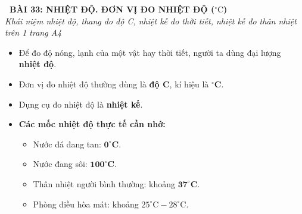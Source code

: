 \documentclass[11pt,a4paper]{article}
\begin{document}
\begin{tcolorbox}[
  enhanced,
  colback=white,
  colframe=primary,
  arc=3mm,
  boxrule=1.2pt,
  left=4mm, right=4mm, top=2.5mm, bottom=2.5mm,
  drop shadow=black!10!white
]
  \centering
  {\Large\bfseries\color{primary}\faBookmark\ BÀI 33: NHIỆT ĐỘ. ĐƠN VỊ ĐO NHIỆT ĐỘ ($^\circ\text{C}$)}\\[1.5mm]
  {\small\itshape\color{black!75}Khái niệm nhiệt độ, thang đo độ C, nhiệt kế đo thời tiết, nhiệt kế đo thân nhiệt trên 1 trang A4}
\end{tcolorbox}

\vspace{-2mm}


\noindent
\begin{minipage}[t]{0.49\textwidth}\vspace{0pt}
\begin{tcolorbox}[
  enhanced,
  colback=blue!4!white,
  colframe=blue!75!black,
  arc=2mm, boxrule=0.8pt,
  left=2mm, right=2mm, top=1.8mm, bottom=1.8mm,
  title={\footnotesize\bfseries\color{white}\faKey\ 1. Khái niệm và Đơn vị nhiệt độ}
]
{\footnotesize
\begin{itemize}\setlength{\itemsep}{1.5pt}\setlength{\leftskip}{-2.5mm}
  \item Để đo độ nóng, lạnh của một vật hay thời tiết, người ta dùng đại lượng \textbf{nhiệt độ}.
  \item Đơn vị đo nhiệt độ thường dùng là \textbf{độ C}, kí hiệu là $\mathbf{^\circ\text{C}}$.
  \item Dụng cụ đo nhiệt độ là \textbf{nhiệt kế}.
  \item \textbf{Các mốc nhiệt độ thực tế cần nhớ:}
  \begin{itemize}\setlength{\itemsep}{0.5pt}\setlength{\leftskip}{-2.5mm}
    \item Nước đá đang tan: $\mathbf{0^\circ\text{C}}$.
    \item Nước đang sôi: $\mathbf{100^\circ\text{C}}$.
    \item Thân nhiệt người bình thường: khoảng $\mathbf{37^\circ\text{C}}$.
    \item Phòng điều hòa mát: khoảng $25^\circ\text{C} - 28^\circ\text{C}$.
  \end{itemize}
\end{itemize}
}
\end{tcolorbox}
\end{minipage}
\hfill
\end{document}
